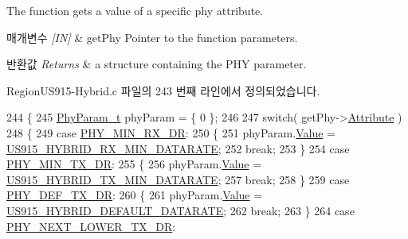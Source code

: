 The function gets a value of a specific phy attribute. 


\begin{DoxyParams}{매개변수}
{\em \mbox{[}\+I\+N\mbox{]}} & get\+Phy Pointer to the function parameters.\\
\hline
\end{DoxyParams}

\begin{DoxyRetVals}{반환값}
{\em Returns} & a structure containing the P\+HY parameter. \\
\hline
\end{DoxyRetVals}


Region\+U\+S915-\/\+Hybrid.\+c 파일의 243 번째 라인에서 정의되었습니다.


\begin{DoxyCode}
244 \{
245     \mbox{\hyperlink{unionu_phy_param}{PhyParam\_t}} phyParam = \{ 0 \};
246 
247     \textcolor{keywordflow}{switch}( getPhy->\mbox{\hyperlink{structs_get_phy_params_abdcb168ffd6913b85e2f635d7a475f2d}{Attribute}} )
248     \{
249         \textcolor{keywordflow}{case} \mbox{\hyperlink{group___r_e_g_i_o_n_gga51cbe8f5433d914fe9cf81b451de2c2da91cb5d84f937c32cd635dd7efe7a9d3a}{PHY\_MIN\_RX\_DR}}:
250         \{
251             phyParam.\mbox{\hyperlink{unionu_phy_param_a8e0dcce3428a8051614e852b8836d0d1}{Value}} = \mbox{\hyperlink{group___r_e_g_i_o_n_u_s915_h_y_b_gaf3c327837e52fbc665c3857f3731c5fe}{US915\_HYBRID\_RX\_MIN\_DATARATE}};
252             \textcolor{keywordflow}{break};
253         \}
254         \textcolor{keywordflow}{case} \mbox{\hyperlink{group___r_e_g_i_o_n_gga51cbe8f5433d914fe9cf81b451de2c2daace3e56c88b40def8ed6a9106871e7de}{PHY\_MIN\_TX\_DR}}:
255         \{
256             phyParam.\mbox{\hyperlink{unionu_phy_param_a8e0dcce3428a8051614e852b8836d0d1}{Value}} = \mbox{\hyperlink{group___r_e_g_i_o_n_u_s915_h_y_b_ga6c7ab6789cb7bb1a5c1e22833905f787}{US915\_HYBRID\_TX\_MIN\_DATARATE}};
257             \textcolor{keywordflow}{break};
258         \}
259         \textcolor{keywordflow}{case} \mbox{\hyperlink{group___r_e_g_i_o_n_gga51cbe8f5433d914fe9cf81b451de2c2da70c3923333165960549162e3dcf10467}{PHY\_DEF\_TX\_DR}}:
260         \{
261             phyParam.\mbox{\hyperlink{unionu_phy_param_a8e0dcce3428a8051614e852b8836d0d1}{Value}} = \mbox{\hyperlink{group___r_e_g_i_o_n_u_s915_h_y_b_ga1ab202b7df1ef278c238dd8958ea0d8a}{US915\_HYBRID\_DEFAULT\_DATARATE}};
262             \textcolor{keywordflow}{break};
263         \}
264         \textcolor{keywordflow}{case} \mbox{\hyperlink{group___r_e_g_i_o_n_gga51cbe8f5433d914fe9cf81b451de2c2dac002e7e492cf30dbf9c544b062f5cc8a}{PHY\_NEXT\_LOWER\_TX\_DR}}:

\end{DoxyCode}
